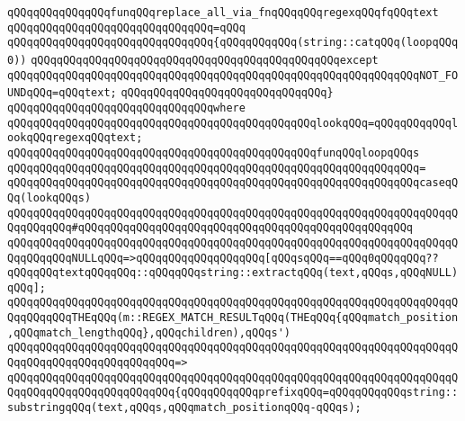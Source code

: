\newline
\newline
\verb|qQQqqQQqqQQqqQQqfunqQQqreplace_all_via_fnqQQqqQQqregexqQQqfqQQqtext|\newline
\verb|qQQqqQQqqQQqqQQqqQQqqQQqqQQqqQQq=qQQq|\newline
\verb|qQQqqQQqqQQqqQQqqQQqqQQqqQQqqQQq{qQQqqQQqqQQq(string::catqQQq(loopqQQq0))|\newline
\verb|qQQqqQQqqQQqqQQqqQQqqQQqqQQqqQQqqQQqqQQqqQQqqQQqexcept|\newline
\verb|qQQqqQQqqQQqqQQqqQQqqQQqqQQqqQQqqQQqqQQqqQQqqQQqqQQqqQQqqQQqqQQqNOT_FOUNDqQQq=qQQqtext;|\newline
\verb|qQQqqQQqqQQqqQQqqQQqqQQqqQQqqQQq}|\newline
\verb|qQQqqQQqqQQqqQQqqQQqqQQqqQQqqQQqwhere|\newline
\verb|qQQqqQQqqQQqqQQqqQQqqQQqqQQqqQQqqQQqqQQqqQQqqQQqlookqQQq=qQQqqQQqqQQqlookqQQqregexqQQqtext;|\newline
\newline
\verb|qQQqqQQqqQQqqQQqqQQqqQQqqQQqqQQqqQQqqQQqqQQqqQQqfunqQQqloopqQQqs|\newline
\verb|qQQqqQQqqQQqqQQqqQQqqQQqqQQqqQQqqQQqqQQqqQQqqQQqqQQqqQQqqQQqqQQq=|\newline
\verb|qQQqqQQqqQQqqQQqqQQqqQQqqQQqqQQqqQQqqQQqqQQqqQQqqQQqqQQqqQQqqQQqcaseqQQq(lookqQQqs)|\newline
\verb|qQQqqQQqqQQqqQQqqQQqqQQqqQQqqQQqqQQqqQQqqQQqqQQqqQQqqQQqqQQqqQQqqQQqqQQqqQQqqQQq#qQQqqQQqqQQqqQQqqQQqqQQqqQQqqQQqqQQqqQQqqQQqqQQqqQQq|\newline
\verb|qQQqqQQqqQQqqQQqqQQqqQQqqQQqqQQqqQQqqQQqqQQqqQQqqQQqqQQqqQQqqQQqqQQqqQQqqQQqqQQqNULLqQQq=>qQQqqQQqqQQqqQQqqQQq[qQQqsqQQq==qQQq0qQQqqQQq??qQQqqQQqtextqQQqqQQq::qQQqqQQqstring::extractqQQq(text,qQQqs,qQQqNULL)qQQq];|\newline
\newline
\verb|qQQqqQQqqQQqqQQqqQQqqQQqqQQqqQQqqQQqqQQqqQQqqQQqqQQqqQQqqQQqqQQqqQQqqQQqqQQqqQQqTHEqQQq(m::REGEX_MATCH_RESULTqQQq(THEqQQq{qQQqmatch_position,qQQqmatch_lengthqQQq},qQQqchildren),qQQqs')|\newline
\verb|qQQqqQQqqQQqqQQqqQQqqQQqqQQqqQQqqQQqqQQqqQQqqQQqqQQqqQQqqQQqqQQqqQQqqQQqqQQqqQQqqQQqqQQqqQQqqQQq=>|\newline
\verb|qQQqqQQqqQQqqQQqqQQqqQQqqQQqqQQqqQQqqQQqqQQqqQQqqQQqqQQqqQQqqQQqqQQqqQQqqQQqqQQqqQQqqQQqqQQqqQQq{qQQqqQQqqQQqprefixqQQq=qQQqqQQqqQQqstring::substringqQQq(text,qQQqs,qQQqmatch_positionqQQq-qQQqs);|\newline
